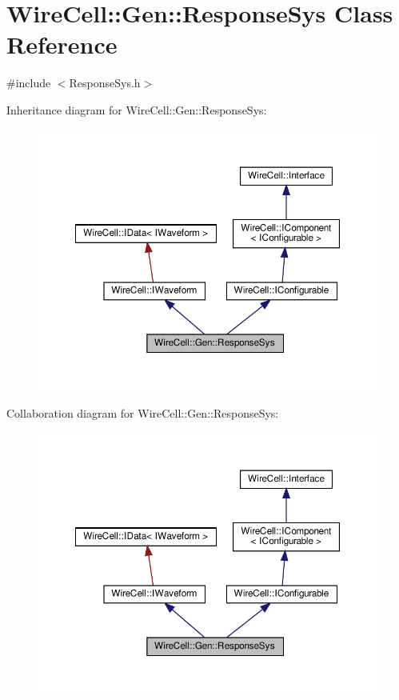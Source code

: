 \hypertarget{class_wire_cell_1_1_gen_1_1_response_sys}{}\section{Wire\+Cell\+:\+:Gen\+:\+:Response\+Sys Class Reference}
\label{class_wire_cell_1_1_gen_1_1_response_sys}


{\ttfamily \#include $<$Response\+Sys.\+h$>$}



Inheritance diagram for Wire\+Cell\+:\+:Gen\+:\+:Response\+Sys\+:
\nopagebreak
\begin{figure}[H]
\begin{center}
\leavevmode
\includegraphics[width=350pt]{class_wire_cell_1_1_gen_1_1_response_sys__inherit__graph}
\end{center}
\end{figure}


Collaboration diagram for Wire\+Cell\+:\+:Gen\+:\+:Response\+Sys\+:
\nopagebreak
\begin{figure}[H]
\begin{center}
\leavevmode
\includegraphics[width=350pt]{class_wire_cell_1_1_gen_1_1_response_sys__coll__graph}
\end{center}
\end{figure}
